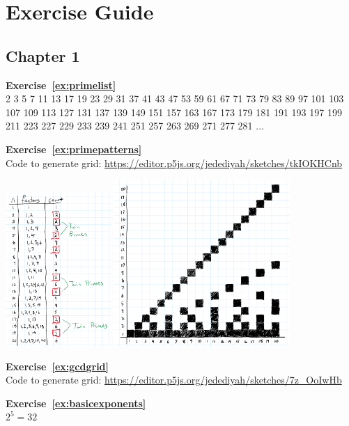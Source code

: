 

\chapter{\textbf{Exercise} Guide}

\section{Chapter 1} 

\noindent \textbf{Exercise~\ref{ex:primelist}} \\
2	3	5	7	11	13	17	19	23	29
31	37	41	43	47	53	59	61	67	71
73	79	83	89	97	101	103	107	109	113
127	131	137	139	149	151	157	163	167	173
179	181	191	193	197	199	211	223	227	229
233	239	241	251	257	263	269	271	277	281 ... 

\noindent \textbf{Exercise~\ref{ex:primepatterns}} \\ 
Code to generate grid: \url{https://editor.p5js.org/jedediyah/sketches/tkIOKHCnb} 
\begin{center}
\includegraphics[width=0.3\textwidth]{img/factor-table.png}
\includegraphics[width=0.5\textwidth]{img/factor-grid.png}
\end{center}

\noindent \textbf{Exercise~\ref{ex:gcdgrid}} \\
Code to generate grid: \url{https://editor.p5js.org/jedediyah/sketches/7z_OoIwHb}

\noindent \textbf{Exercise~\ref{ex:basicexponents}} \\
\(2^{5} = 32\)
